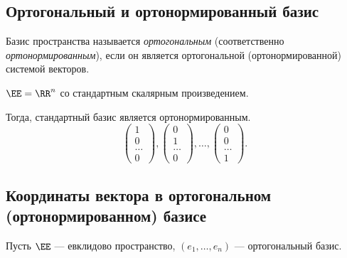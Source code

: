 \begin{comment}
    Всякая ортогональная (и в частности ортонормированная) система векторов автоматически линейно независима.
    \begin{equation*}
        \det G(v_1, \dots, v_k) = |v_1|^2 \cdot |v_2|^2 \dotsm |v_k|^2 \neq 0
    .\end{equation*}
\end{comment}


\subsection{Ортогональный и ортонормированный базис}

\begin{definition}
    Базис пространства называется \textit{ортогональным} (соответственно \textit{ортонормированным}), если он является ортогональной (ортонормированной) системой векторов.
\end{definition}


\begin{example}
    $\EE = \RR^n$ со стандартным скалярным произведением.

    Тогда, стандартный базис является ортонормированным.
    \begin{equation*}
        \begin{pmatrix} 1 \\ 0 \\ \dots \\ 0 \end{pmatrix},
        \begin{pmatrix} 0 \\ 1 \\ \dots \\ 0 \end{pmatrix},
        \dots,
        \begin{pmatrix} 0 \\ 0 \\ \dots \\ 1 \end{pmatrix}
    .\end{equation*}
\end{example}


\subsection{Координаты вектора в ортогональном (ортонормированном) базисе}

Пусть $\EE$ --- евклидово пространство, $(e_1, \dots, e_n)$ --- ортогональный базис.

